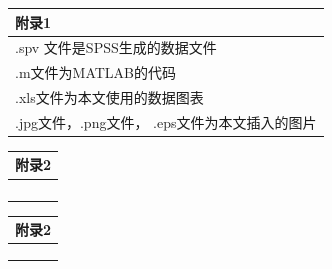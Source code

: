 \documentclass{my_paper}
\begin{document}
\begin{table}[htbp]
    \centering
    \begin{tabular}{|p{14.0cm}|}

    \hline
    \textbf{附录1} \\ %
    \hline
    .spv 文件是SPSS生成的数据文件 \\ 
     .m文件为MATLAB的代码\\
     .xls文件为本文使用的数据图表\\
     .jpg文件，.png文件， .eps文件为本文插入的图片\\
    \hline
    \end{tabular}
\end{table}
\newpage
\begin{table}[htbp]
    \centering
    \begin{tabular}{|p{14.0cm}|}

    \hline
    \textbf{附录2} \\ 
    \hline
    \\ 
    \\
    \\
    \\
    \hline
    \end{tabular}
\end{table}

\newpage
\begin{table}[htbp]
    \centering
    \begin{tabular}{|p{14.0cm}|}

    \hline
    \textbf{附录2} \\ 
    \hline
    \\ 
    
    \\
    \\
    \hline
    \end{tabular}
\end{table}
\end{document}
